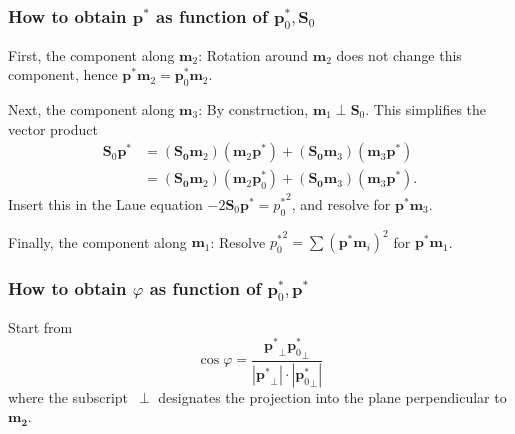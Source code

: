 \documentclass[twocolumn,preprintnumbers,amsmath,amssymb]{revtex4}
\def\v#1{\mathbf{#1}}
\begin{document}
\subsubsection{How to obtain $\v{p}^*$ as function of $\v{p}^*_0,\v{S}_0$}

First, the component along $\v{m}_2$: Rotation around $\v{m}_2$ does not change this component,
hence $\v{p}^*\v{m}_2 = \v{p}^*_0\v{m}_2$.

Next, the component along $\v{m}_3$:
By construction, $\v{m}_1\perp\v{S}_0$.
This simplifies the vector product
\begin{equation}
\begin{array}{ll}
   \v{S}_0\v{p}^*&=(\v{S_0}\v{m}_2)(\v{m}_2\v{p}^*) + (\v{S_0}\v{m}_3)(\v{m}_3\v{p}^*)
\\
                &=(\v{S_0}\v{m}_2)(\v{m}_2\v{p}^*_0) + (\v{S_0}\v{m}_3)(\v{m}_3\v{p}^*).
\end{array}
\end{equation}
Insert this in the Laue equation $-2\v{S}_0\v{p}^*={p^*_0}^2$,
and resolve for $\v{p}^*\v{m}_3$.

Finally, the component along $\v{m}_1$:
Resolve ${p^*_0}^2=\sum {(\v{p}^*\v{m}_i)}^2$ for $\v{p}^*\v{m}_1$.

\subsubsection{How to obtain $\varphi$ as function of $\v{p}^*_0,\v{p}^*$}

Start from
\begin{equation}
  \cos\varphi=\frac{{\v{p}^*}_\perp{\v{p}^*_0}_\perp}{|{\v{p}^*}_\perp|\cdot|{\v{p}^*_0}_\perp|}
\end{equation}
where the subscript~$\perp$ designates the projection into the plane
perpendicular to $\v{m_2}$.



\end{document}
